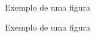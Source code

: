 \documentclass[a4paper,12pt]{report}
\begin{document}
\begin{figure}[htbp]
   \centering
   \caption{Exemplo de uma figura}
\end{figure}

\begin{figure}[htbp]
   \centering
   \caption{Exemplo de uma figura}
\end{figure}
\end{document}

